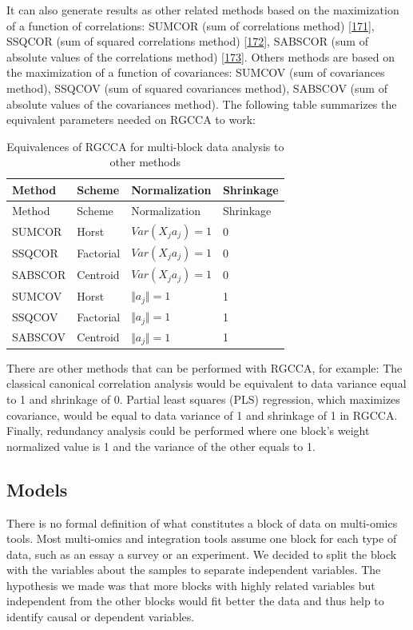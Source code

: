 \documentclass[
  a4paper,
]{book}
\begin{document}
It can also generate results as other related methods based on the maximization of a function of correlations: SUMCOR (sum of correlations method) {[}\protect\hyperlink{ref-horst1961}{171}{]}, SSQCOR (sum of squared correlations method) {[}\protect\hyperlink{ref-kettenring1971}{172}{]}, SABSCOR (sum of absolute values of the correlations method) {[}\protect\hyperlink{ref-vandegeer1984}{173}{]}.
Others methods are based on the maximization of a function of covariances: SUMCOV (sum of covariances method), SSQCOV (sum of squared covariances method), SABSCOV (sum of absolute values of the covariances method).
The following table summarizes the equivalent parameters needed on RGCCA to work:

\begin{longtable}[]{@{}llll@{}}
\caption{\label{tab:RGCCA-methods} Equivalences of RGCCA for multi-block data analysis to other methods}\tabularnewline
\toprule
Method & Scheme & Normalization & Shrinkage \\
\midrule
\endfirsthead
\toprule
Method & Scheme & Normalization & Shrinkage \\
\midrule
\endhead
SUMCOR & Horst & \(Var(X_j a_j) = 1\) & 0 \\
SSQCOR & Factorial & \(Var(X_j a_j) = 1\) & 0 \\
SABSCOR & Centroid & \(Var(X_j a_j) = 1\) & 0 \\
SUMCOV & Horst & \(\Vert a_j \Vert = 1\) & 1 \\
SSQCOV & Factorial & \(\Vert a_j \Vert = 1\) & 1 \\
SABSCOV & Centroid & \(\Vert a_j \Vert = 1\) & 1 \\
\bottomrule
\end{longtable}

There are other methods that can be performed with RGCCA, for example: The classical canonical correlation analysis would be equivalent to data variance equal to 1 and shrinkage of 0.
Partial least squares (PLS) regression, which maximizes covariance, would be equal to data variance of 1 and shrinkage of 1 in RGCCA. Finally, redundancy analysis could be performed where one block's weight normalized value is 1 and the variance of the other equals to 1.

\hypertarget{models}{%
\subsection{Models}\label{models}}

There is no formal definition of what constitutes a block of data on multi-omics tools.
Most multi-omics and integration tools assume one block for each type of data, such as an essay a survey or an experiment.
We decided to split the block with the variables about the samples to separate independent variables.
The hypothesis we made was that more blocks with highly related variables but independent from the other blocks would fit better the data and thus help to identify causal or dependent variables.
\end{document}

